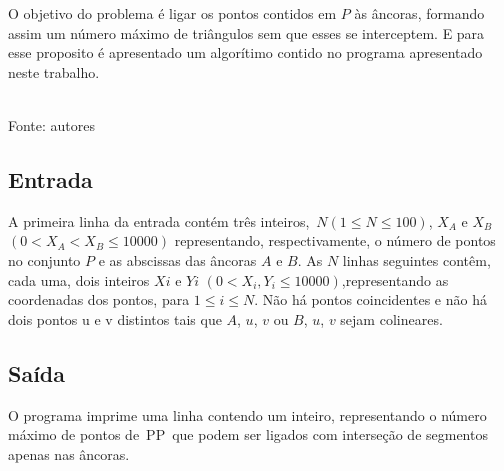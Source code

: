 \documentclass[12pt,a4paper]{article}
\begin{document}
O objetivo do problema é ligar os pontos contidos em $P$ às âncoras, formando assim um número máximo de triângulos sem que esses se interceptem. E para esse proposito é apresentado um algorítimo contido no programa apresentado neste trabalho.

\begin{center}
	\footnotesize{\\Fonte: autores}
\end{center}

\subsection{Entrada}

A primeira linha da entrada contém três inteiros, $N(1 \leqslant N \leqslant 100)$, $X_A$ e $X_B$ $(0 < X_A < X_B \leqslant 10000)$ representando, respectivamente, o número de pontos no conjunto $P$ e as abscissas das âncoras $A$ e $B$. As $N$ linhas seguintes contêm, cada uma, dois inteiros $Xi$ e $Yi$ $(0 < X_i, Y_i \leqslant 10000)$,representando as coordenadas dos pontos, para $1 \leqslant i \leqslant N$. Não há pontos coincidentes e não há dois pontos u e v distintos tais que $A$, $u$, $v$ ou $B$, $u$, $v$ sejam colineares.

\subsection{Saída}

O programa imprime uma linha contendo um inteiro, representando o número máximo de pontos de PP que podem ser ligados com interseção de segmentos apenas nas âncoras.
\end{document}
